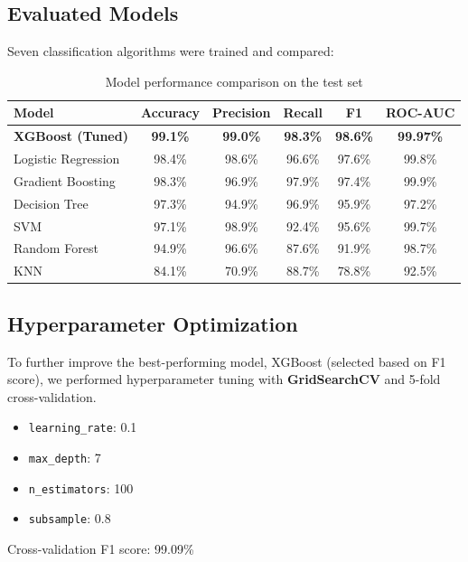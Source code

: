 \documentclass[12pt,a4paper]{article}
\begin{document}
\subsection{Evaluated Models}

Seven classification algorithms were trained and compared:

\begin{table}[H]
\centering
\begin{tabular}{lccccc}
\toprule
\textbf{Model} & \textbf{Accuracy} & \textbf{Precision} & \textbf{Recall} & \textbf{F1} & \textbf{ROC-AUC} \\
\midrule
\textbf{XGBoost (Tuned)} & \textbf{99.1\%} & \textbf{99.0\%} & \textbf{98.3\%} & \textbf{98.6\%} & \textbf{99.97\%} \\
Logistic Regression & 98.4\% & 98.6\% & 96.6\% & 97.6\% & 99.8\% \\
Gradient Boosting & 98.3\% & 96.9\% & 97.9\% & 97.4\% & 99.9\% \\
Decision Tree & 97.3\% & 94.9\% & 96.9\% & 95.9\% & 97.2\% \\
SVM & 97.1\% & 98.9\% & 92.4\% & 95.6\% & 99.7\% \\
Random Forest & 94.9\% & 96.6\% & 87.6\% & 91.9\% & 98.7\% \\
KNN & 84.1\% & 70.9\% & 88.7\% & 78.8\% & 92.5\% \\
\bottomrule
\end{tabular}
\caption{Model performance comparison on the test set}
\end{table}

\subsection{Hyperparameter Optimization}

To further improve the best-performing model, XGBoost (selected based on F1 score), we performed hyperparameter tuning with \textbf{GridSearchCV} and 5-fold cross-validation.

\begin{tcolorbox}[title=Optimal Hyperparameters - XGBoost, colback=white, colframe=black]
\begin{itemize}
    \item \texttt{learning\_rate}: 0.1
    \item \texttt{max\_depth}: 7
    \item \texttt{n\_estimators}: 100
    \item \texttt{subsample}: 0.8
\end{itemize}
Cross-validation F1 score: 99.09\%
\end{tcolorbox}
\end{document}
